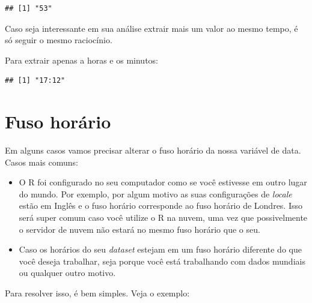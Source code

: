 \documentclass[
]{book}
\newenvironment{Shaded}{\begin{snugshade}}{\end{snugshade}}
\newcommand{\CommentTok}[1]{\textcolor[rgb]{0.56,0.35,0.01}{\textit{#1}}}
\newcommand{\KeywordTok}[1]{\textcolor[rgb]{0.13,0.29,0.53}{\textbf{#1}}}
\newcommand{\NormalTok}[1]{#1}
\newcommand{\StringTok}[1]{\textcolor[rgb]{0.31,0.60,0.02}{#1}}
\begin{document}
\begin{verbatim}
## [1] "53"
\end{verbatim}

Caso seja interessante em sua análise extrair mais um valor ao mesmo
tempo, é só seguir o mesmo raciocínio.

Para extrair apenas a horas e os minutos:

\begin{Shaded}
\end{Shaded}

\begin{verbatim}
## [1] "17:12"
\end{verbatim}

\hypertarget{fuso-horuxe1rio}{%
\section{Fuso horário}\label{fuso-horuxe1rio}}

Em alguns casos vamos precisar alterar o fuso horário da nossa variável
de data. Casos mais comuns:

\begin{itemize}
\item
  O R foi configurado no seu computador como se você estivesse em outro
  lugar do mundo. Por exemplo, por algum motivo as suas configurações de
  \emph{locale} estão em Inglês e o fuso horário corresponde ao fuso
  horário de Londres. Isso será super comum caso você utilize o R na
  nuvem, uma vez que possivelmente o servidor de nuvem não estará no
  mesmo fuso horário que o seu.
\item
  Caso os horários do seu \emph{dataset} estejam em um fuso horário
  diferente do que você deseja trabalhar, seja porque você está
  trabalhando com dados mundiais ou qualquer outro motivo.
\end{itemize}

Para resolver isso, é bem simples. Veja o exemplo:
\end{document}

